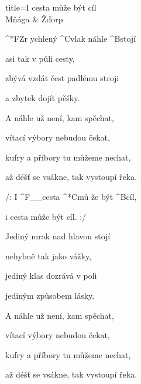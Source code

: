 \begin{song}{title=\predtitle\centering I cesta může být cíl \\\large Mňága \& Žďorp\vspace*{-0.3cm}}  %
\begin{centerjustified}
\nejnejvetsi

\sloka
	^*{F}Zr ychlený ^{C}vlak náhle ^{B}stojí
	
	asi tak v půli cesty,
   	
   	zbývá vzdát čest padlému stroji
   
   	a zbytek dojít pěšky.
   	
\sloka
	A náhle už není, kam spěchat,

	vítací výbory nebudou čekat,
   	
   	kufry a příbory tu můžeme nechat,
   
   	až déšť se vsákne, tak vystoupí řeka.
   	
	/: I ^{F{\color{white}\_\_}}cesta ^*{C}mů že být ^{B}cíl,
	
	i cesta může být cíl. :/

\sloka
	Jediný mrak nad hlavou stojí
   
   	nehybně tak jako vážky,
   
   	jediný klas dozrává v poli
   
   	jediným způsobem lásky.
   	
\sloka 
	A náhle už není, kam spěchat,
   	
   	vítací výbory nebudou čekat,
   
   	kufry a příbory tu můžeme nechat,
   
   	až déšť se vsákne, tak vystoupí řeka.
   	


\end{centerjustified}
\setcounter{Slokočet}{0}
\end{song}
